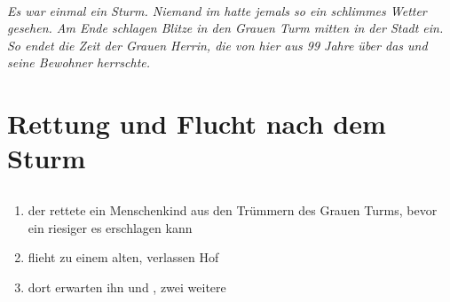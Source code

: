\documentclass[12pt,a4paper,onecolumn,oneside,ngerman]{book}
\begin{document}
  
  
  
\tableofcontents
  
\clearpage{\pagestyle{empty}\cleardoublepage}
  
\raggedright 
  
\paragraph{}
\textit{Es war einmal ein Sturm.
Niemand im {\Enland} hatte jemals so ein schlimmes Wetter gesehen.
Am Ende schlagen Blitze in den Grauen Turm mitten in der Stadt {\Tern} ein.
So endet die Zeit der Grauen Herrin, die von hier aus 99 Jahre über das {\Enland} und seine Bewohner herrschte.
}

\part{Rettung und Flucht nach dem Sturm}
\chapter[Der {\Schattenlaufer}]{}
\begin{enumerate}
  \item {\Eno} der {\Schattenlaufer} rettete ein Menschenkind aus den Trümmern des Grauen Turms, bevor ein riesiger {\Bangiri} es erschlagen kann
  \item {\Eno} flieht zu einem alten, verlassen Hof
  \item dort erwarten ihn {\Bomar} und {\Dolo}, zwei weitere {\Schattenlaufer}
\end{enumerate}
\end{document}
